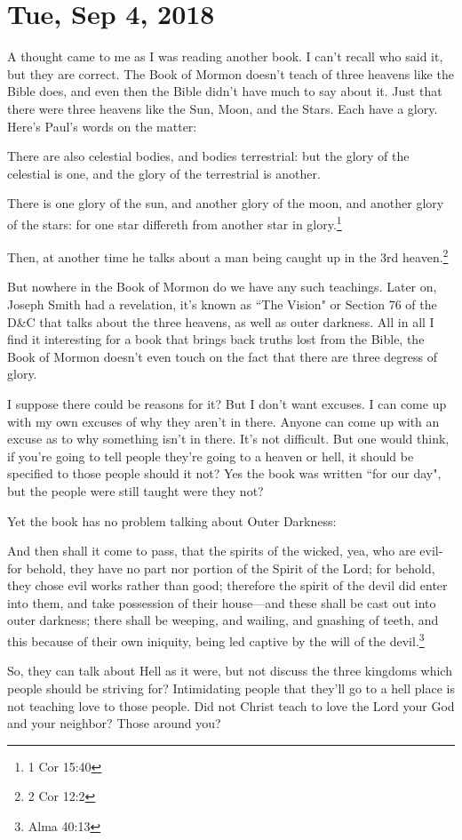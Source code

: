 \section{Tue, Sep 4, 2018}

A thought came to me as I was reading another book. I can't recall who said it, but
they are correct. The Book of Mormon doesn't teach of three heavens like the Bible
does, and even then the Bible didn't have much to say about it. Just that there were
three heavens like the Sun, Moon, and the Stars. Each have a glory. Here's Paul's
words on the matter:

\begin{displayquote}
There are also celestial bodies, and bodies terrestrial: but the glory of the 
celestial is one, and the glory of the terrestrial is another.

There is one glory of the sun, and another glory of the moon, and another glory of 
the stars: for one star differeth from another star in glory.\footnote{1 Cor 15:40}
\end{displayquote}

Then, at another time he talks about a man being caught up in the 3rd
heaven.\footnote{2 Cor 12:2}

But nowhere in the Book of Mormon do we have any such teachings. Later on, Joseph
Smith had a revelation, it's known as ``The Vision" or Section 76 of the D\&C that
talks about the three heavens, as well as outer darkness. All in all I find it
interesting for a book that brings back truths lost from the Bible, the Book of
Mormon doesn't even touch on the fact that there are three degress of glory.

I suppose there could be reasons for it? But I don't want excuses. I can come up with
my own excuses of why they aren't in there. Anyone can come up with an excuse as to
why something isn't in there. It's not difficult. But one would think, if you're
going to tell people they're going to a heaven or hell, it should be specified to
those people should it not? Yes the book was written ``for our day", but the people
were still taught were they not?

Yet the book has no problem talking about Outer Darkness:

\begin{displayquote}
And then shall it come to pass, that the spirits of the wicked, yea, who are 
evil-for behold, they have no part nor portion of the Spirit of the Lord; for 
behold, they chose evil works rather than good; therefore the spirit of the devil 
did enter into them, and take possession of their house—and these shall be cast out 
into outer darkness; there shall be weeping, and wailing, and gnashing of teeth, 
and this because of their own iniquity, being led captive by the will of the 
devil.\footnote{Alma 40:13}
\end{displayquote}

So, they can talk about Hell as it were, but not discuss the three kingdoms which
people should be striving for? Intimidating people that they'll go to a hell place 
is not teaching love to those people. Did not Christ teach to love the Lord your God
and your neighbor? Those around you?